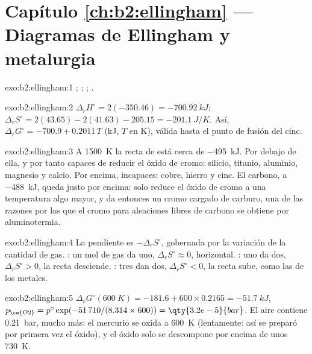 \section*{Capítulo \ref{ch:b2:ellingham} --- Diagramas de Ellingham y metalurgia}

\begin{solution}{exo:b2:ellingham:1}
; ; ;
.
\end{solution}

\begin{solution}{exo:b2:ellingham:2}
$\Delta_r H^\circ = 2(-350.46) = \qty{-700.92}{kJ}$; $\Delta_r S^\circ = 2(43.65)
- 2(41.63) - 205.15 = \qty{-201.1}{J/K}$. Así, $\Delta_r G^\circ = -700.9 +
0.2011\,T$ (\unit{kJ}, $T$ en \unit{K}), válida hasta el punto de fusión del cinc.
\end{solution}

\begin{solution}{exo:b2:ellingham:3}
A \qty{1500}{K} la recta de  está cerca de \qty{-495}{kJ}. Por debajo de ella, y por tanto
capaces de reducir el óxido de cromo: silicio, titanio, aluminio, magnesio y
calcio. Por encima, incapaces: cobre, hierro y cinc. El carbono, a \qty{-488}{kJ}, queda
justo por encima: solo reduce el óxido de cromo a una temperatura algo mayor,
y da entonces un cromo cargado de carburo, una de las razones por las que el cromo para
aleaciones libres de carbono se obtiene por aluminotermia.
\end{solution}

\begin{solution}{exo:b2:ellingham:4}
La pendiente es $-\Delta_r S^\circ$, gobernada por la variación de la cantidad de gas.
: un mol de gas da uno, $\Delta_r S^\circ \approx 0$,
horizontal. : uno da dos, $\Delta_r S^\circ > 0$, la
recta desciende. : tres dan dos, $\Delta_r S^\circ < 0$, la
recta sube, como las de los metales.
\end{solution}

\begin{solution}{exo:b2:ellingham:5}
$\Delta_r G^\circ(\qty{600}{K}) = -181.6 + 600 \times 0.2165 = \qty{-51.7}{kJ}$,
$p_{\ce{O2}} = p^\circ\exp(-51\,710/(8.314 \times 600)) = \qty{3.2e-5}{bar}$. El aire
contiene \qty{0.21}{bar}, mucho más: el mercurio se oxida a \qty{600}{K} (lentamente:
así se preparó por primera vez el óxido), y el óxido solo se descompone
por encima de unos \qty{730}{K}.
\end{solution}

